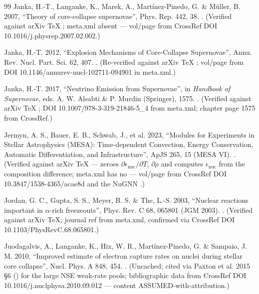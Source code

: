 \begin{thebibliography}{99}
Janka, H.-T., Langanke, K., Marek, A., Mart\'inez-Pinedo, G. \& M\"uller, B. 2007, ``Theory of core-collapse supernovae'', Phys. Rep. 442, 38. . (Verified against arXiv TeX ; meta.xml absent --- vol/page from CrossRef DOI 10.1016/j.physrep.2007.02.002.)

Janka, H.-T. 2012, ``Explosion Mechanisms of Core-Collapse Supernovae'', Annu. Rev. Nucl. Part. Sci. 62, 407. . (Re-verified against arXiv TeX ; vol/page from DOI 10.1146/annurev-nucl-102711-094901 in meta.xml.)

Janka, H.-T. 2017, ``Neutrino Emission from Supernovae'', in \emph{Handbook of Supernovae}, eds. A. W. Alsabti \& P. Murdin (Springer), 1575. . (Verified against arXiv TeX ; DOI 10.1007/978-3-319-21846-5\_4 from meta.xml; chapter page 1575 from CrossRef.)

Jermyn, A. S., Bauer, E. B., Schwab, J., et al. 2023, ``Modules for Experiments in Stellar Astrophysics (MESA): Time-dependent Convection, Energy Conservation, Automatic Differentiation, and Infrastructure'', ApJS 265, 15 (MESA VI). . (Verified against arXiv TeX  ---  zeroes $\partial\epsilon_{\mathrm{nuc}}/\partial T$, $\partial\rho$ and computes $\epsilon_{\mathrm{nuc}}$ from the composition difference; meta.xml has no  --- vol/page from CrossRef DOI 10.3847/1538-4365/acae8d and the NuGNN .)

Jordan, G. C., Gupta, S. S., Meyer, B. S. \& The, L.-S. 2003, ``Nuclear reactions important in $\alpha$-rich freezeouts'', Phys. Rev. C 68, 065801 (JGM 2003). . (Verified against arXiv TeX; journal ref from meta.xml, confirmed via CrossRef DOI 10.1103/PhysRevC.68.065801.)

Juodagalvis, A., Langanke, K., Hix, W. R., Mart\'inez-Pinedo, G. \& Sampaio, J. M. 2010, ``Improved estimate of electron capture rates on nuclei during stellar core collapse'', Nucl. Phys. A 848, 454. . (Uncached; cited via Paxton et al. 2015 \S 6 () for the large NSE weak-rate pools; bibliographic data from CrossRef DOI 10.1016/j.nuclphysa.2010.09.012 --- content ASSUMED-with-attribution.)


\end{thebibliography}

